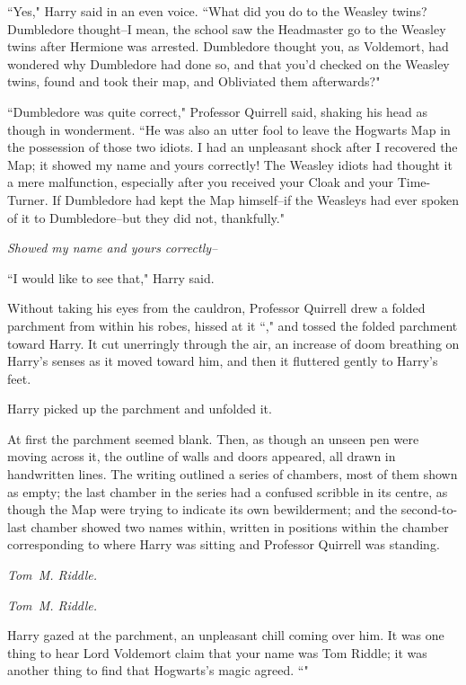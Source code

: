 ``Yes," Harry said in an even voice. ``What did you do to the Weasley twins? Dumbledore thought\---I mean, the school saw the Headmaster go to the Weasley twins after Hermione was arrested. Dumbledore thought you, as Voldemort, had wondered why Dumbledore had done so, and that you'd checked on the Weasley twins, found and took their map, and Obliviated them afterwards?"

``Dumbledore was quite correct," Professor Quirrell said, shaking his head as though in wonderment. ``He was also an utter fool to leave the Hogwarts Map in the possession of those two idiots. I had an unpleasant shock after I recovered the Map; it showed my name and yours correctly! The Weasley idiots had thought it a mere malfunction, especially after you received your Cloak and your Time-Turner. If Dumbledore had kept the Map himself\---if the Weasleys had ever spoken of it to Dumbledore\---but they did not, thankfully."

\emph{Showed my name and yours correctly\---}

``I would like to see that," Harry said.

Without taking his eyes from the cauldron, Professor Quirrell drew a folded parchment from within his robes, hissed at it ``," and tossed the folded parchment toward Harry. It cut unerringly through the air, an increase of doom breathing on Harry's senses as it moved toward him, and then it fluttered gently to Harry's feet.

Harry picked up the parchment and unfolded it.

At first the parchment seemed blank. Then, as though an unseen pen were moving across it, the outline of walls and doors appeared, all drawn in handwritten lines. The writing outlined a series of chambers, most of them shown as empty; the last chamber in the series had a confused scribble in its centre, as though the Map were trying to indicate its own bewilderment; and the second-to-last chamber showed two names within, written in positions within the chamber corresponding to where Harry was sitting and Professor Quirrell was standing.

\emph{Tom~M. Riddle.}

\emph{Tom~M. Riddle.}

Harry gazed at the parchment, an unpleasant chill coming over him. It was one thing to hear Lord Voldemort claim that your name was Tom Riddle; it was another thing to find that Hogwarts's magic agreed. ``"


